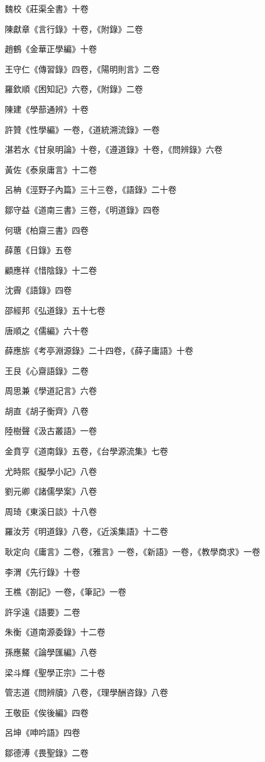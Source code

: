 魏校《莊渠全書》十卷

陳獻章《言行錄》十卷，《附錄》二卷

趙鶴《金華正學編》十卷

王守仁《傳習錄》四卷，《陽明則言》二卷

羅欽順《困知記》六卷，《附錄》二卷

陳建《學蔀通辨》十卷

許贊《性學編》一卷，《道統溯流錄》一卷

湛若水《甘泉明論》十卷，《遵道錄》十卷，《問辨錄》六卷

黃佐《泰泉庸言》十二卷

呂柟《涇野子內篇》三十三卷，《語錄》二十卷

鄒守益《道南三書》三卷，《明道錄》四卷

何瑭《柏齋三書》四卷

薛蕙《日錄》五卷

顧應祥《惜陰錄》十二卷

沈霽《語錄》四卷

邵經邦《弘道錄》五十七卷

唐順之《儒編》六十卷

薛應旂《考亭淵源錄》二十四卷，《薛子庸語》十卷

王艮《心齋語錄》二卷

周思兼《學道記言》六卷

胡直《胡子衡齊》八卷

陸樹聲《汲古叢語》一卷

金賁亨《道南錄》五卷，《台學源流集》七卷

尤時熙《擬學小記》八卷

劉元卿《諸儒學案》八卷

周琦《東溪日談》十八卷

羅汝芳《明道錄》八卷，《近溪集語》十二卷

耿定向《庸言》二卷，《雅言》一卷，《新語》一卷，《教學商求》一卷

李渭《先行錄》十卷

王樵《劄記》一卷，《筆記》一卷

許孚遠《語要》二卷

朱衡《道南源委錄》十二卷

孫應鰲《論學匯編》八卷

梁斗輝《聖學正宗》二十卷

管志道《問辨牘》八卷，《理學酬咨錄》八卷

王敬臣《俟後編》四卷

呂坤《呻吟語》四卷

鄒德溥《畏聖錄》二卷

